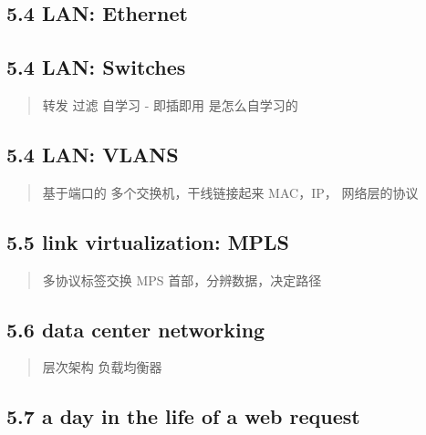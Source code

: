 \documentclass[
]{article}
\begin{document}
\hypertarget{54-lan-ethernet}{%
\subsection{5.4 LAN: Ethernet}\label{54-lan-ethernet}}

\hypertarget{54-lan-switches}{%
\subsection{5.4 LAN: Switches}\label{54-lan-switches}}

\begin{quote}
转发 过滤 自学习 - 即插即用 是怎么自学习的
\end{quote}

\hypertarget{54-lan-vlans}{%
\subsection{5.4 LAN: VLANS}\label{54-lan-vlans}}

\begin{quote}
基于端口的 多个交换机，干线链接起来 MAC，IP， 网络层的协议
\end{quote}

\hypertarget{55-link-virtualization-mpls}{%
\subsection{5.5 link virtualization:
MPLS}\label{55-link-virtualization-mpls}}

\begin{quote}
多协议标签交换 MPS 首部，分辨数据，决定路径
\end{quote}

\hypertarget{56-data-center-networking}{%
\subsection{5.6 data center
networking}\label{56-data-center-networking}}

\begin{quote}
层次架构 负载均衡器
\end{quote}

\hypertarget{57-a-day-in-the-life-of-a-web-request}{%
\subsection{5.7 a day in the life of a web
request}\label{57-a-day-in-the-life-of-a-web-request}}
\end{document}
